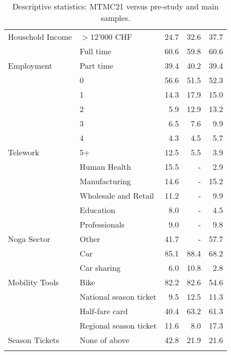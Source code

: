 {\begin{center}
\begin{longtable}{llrrr}
\multirow[t]{-5}{*}{\raggedright\arraybackslash Household Income} & $>$12'000 CHF & 24.7 & 32.6 & 37.7\\
& Full time & 60.6 & 59.8 & 60.6\\
\multirow[t]{-2}{*}{\raggedright\arraybackslash Employment} & Part time & 39.4 & 40.2 & 39.4\\
& 0 & 56.6 & 51.5 & 52.3\\
& 1 & 14.3 & 17.9 & 15.0\\
& 2 & 5.9 & 12.9 & 13.2\\
& 3 & 6.5 & 7.6 & 9.9\\
& 4 & 4.3 & 4.5 & 5.7\\
\multirow[t]{-6}{*}{\raggedright\arraybackslash Telework} & 5+ & 12.5 & 5.5 & 3.9\\
& Human Health & 15.5 & - & 2.9\\
& Manufacturing & 14.6 & - & 15.2\\
& Wholesale and Retail & 11.2 & - & 9.9\\
& Education & 8.0 & - & 4.5\\
& Professionals & 9.0 & - & 9.8\\
\multirow[t]{-6}{*}{\raggedright\arraybackslash Noga Sector} & Other & 41.7 & - & 57.7\\
& Car & 85.1 & 88.4 & 68.2\\
& Car sharing & 6.0 & 10.8 & 2.8\\
\multirow[t]{-3}{*}{\raggedright\arraybackslash Mobility Tools} & Bike & 82.2 & 82.6 & 54.6\\
& National season ticket & 9.5 & 12.5 & 11.3\\
& Half-fare card & 40.4 & 63.2 & 61.3\\
& Regional season ticket & 11.6 & 8.0 & 17.3\\
\multirow[t]{-4}{*}{\raggedright\arraybackslash Season Tickets} & None of above & 42.8 & 21.9 & 21.6\\
\bottomrule
\caption{\label{tab:mzmv-marginals} Descriptive statistics: MTMC21 versus pre-study and main samples.}
\end{longtable}
\end{center}
}

